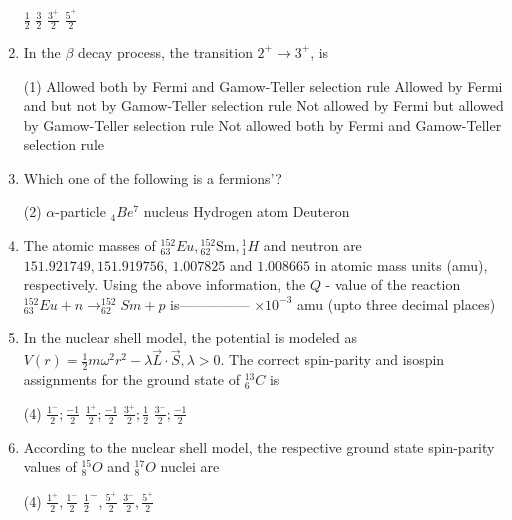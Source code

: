 \begin{enumerate}
\begin{tasks}
		\task[\textbf{A.}] $\frac{1}{2}$
		\task[\textbf{B.}] $\frac{3}{2}$
		\task[\textbf{C.}] $\frac{3^{+}}{2}$
		\task[\textbf{D.}] $\frac{5^{+}}{2}$
	\end{tasks}
	\item In the $\beta$ decay process, the transition $2^{+} \rightarrow 3^{+}$, is
	{}
	\begin{tasks}(1)
		\task[\textbf{A.}] Allowed both by Fermi and Gamow-Teller selection rule
		\task[\textbf{B.}]  Allowed by Fermi and but not by Gamow-Teller selection rule
		\task[\textbf{C.}] Not allowed by Fermi but allowed by Gamow-Teller selection rule
		\task[\textbf{D.}] Not allowed both by Fermi and Gamow-Teller selection rule
	\end{tasks}
	\item Which one of the following is a fermions'?
	{}
	\begin{tasks}(2)
		\task[\textbf{A.}] $\alpha$-particle
		\task[\textbf{B.}] ${ }_{4} B e^{7}$ nucleus
		\task[\textbf{C.}] Hydrogen atom
		\task[\textbf{D.}] Deuteron
	\end{tasks}
	\item The atomic masses of ${ }_{63}^{152} E u,{ }_{62}^{152} \mathrm{Sm},{ }_{1}^{1} H$ and neutron are $151.921749,151.919756$, $1.007825$ and $1.008665$ in atomic mass units (amu), respectively. Using the above information, the $Q$ - value of the reaction ${ }_{63}^{152} E u+n \rightarrow_{62}^{152} S m+p$ is--------------- $\times 10^{-3}$ amu (upto three decimal places)
	{}
	\item In the nuclear shell model, the potential is modeled as $V(r)=\frac{1}{2} m \omega^{2} r^{2}-\lambda \vec{L} \cdot \vec{S}, \lambda>0$. The correct spin-parity and isospin assignments for the ground state of ${ }_{6}^{13} C$ is
	{}
	\begin{tasks}(4)
		\task[\textbf{A.}] $\frac{1^{-}}{2} ; \frac{-1}{2}$
		\task[\textbf{B.}] $\frac{1^{+}}{2} ; \frac{-1}{2}$
		\task[\textbf{C.}] $\frac{3^{+}}{2} ; \frac{1}{2}$
		\task[\textbf{D.}] $\frac{3^{-}}{2} ; \frac{-1}{2}$
	\end{tasks}
	\item According to the nuclear shell model, the respective ground state spin-parity values of ${ }_{8}^{15} O$ and ${ }_{8}^{17} O$ nuclei are
	{}
	\begin{tasks}(4)
		\task[\textbf{A.}] $\frac{1^{+}}{2}, \frac{1^{-}}{2}$
		\task[\textbf{B.}] $\frac{1}{2}^{-}, \frac{5^{+}}{2}$
		\task[\textbf{C.}] $\frac{3^{-}}{2}, \frac{5^{+}}{2}$

\end{tasks}
\end{enumerate}
